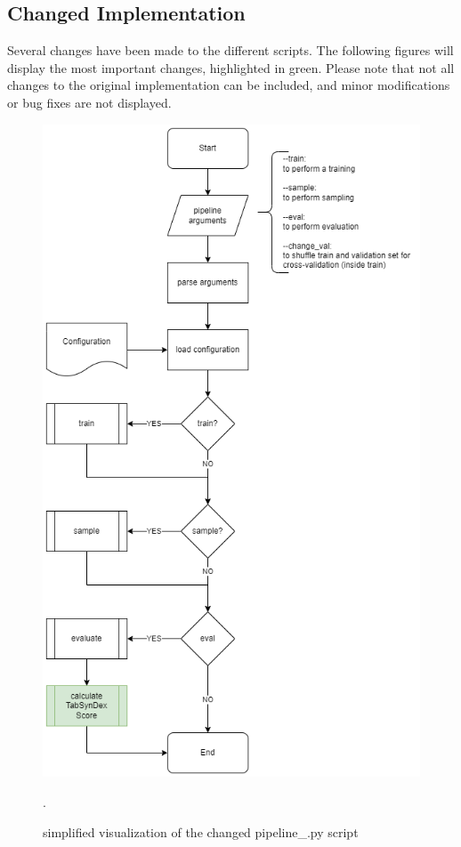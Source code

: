 \subsection[]{Changed Implementation}
Several changes have been made to the different scripts.
The following figures will display the most important changes, highlighted in green.
Please note that not all changes to the original implementation can be included, and minor modifications or bug fixes are not displayed.

\begin{figure}
	\centering
	\includegraphics[width=\textwidth, height=\textheight, keepaspectratio]{images/pipeline-CHANGED.png}
	\caption{simplified visualization of the changed pipeline\_\*.py script}
	\label{fig:a_pipeline_changed}.
\end{figure}
